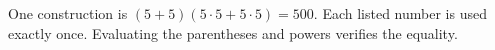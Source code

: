 One construction is $\boxed{(5+5)(5\cdot5+5\cdot5)=500}$. Each listed number is used exactly once. Evaluating the parentheses and powers verifies the equality.
